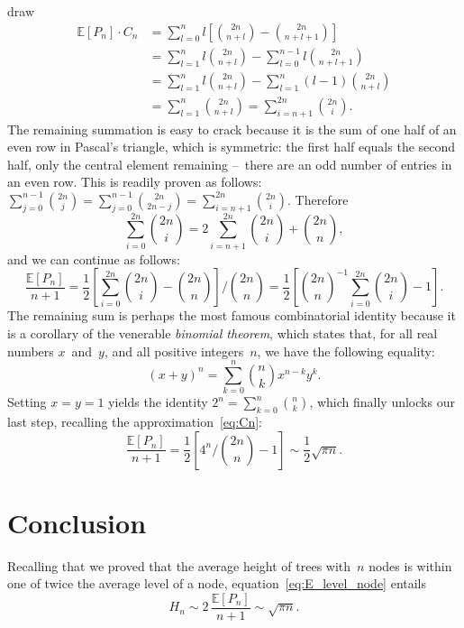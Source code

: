 \documentclass[11pt]{article}
\newcommand\Expected[1]{\mathbb{E}[{#1}]}
\begin{document}
draw
\begin{align*}
\Expected{P_n} \cdot C_n
 &= \sum_{l=0}^{n}l\left[\binom{2n}{n+l} - \binom{2n}{n+l+1}\right]\\
 &= \sum_{l=1}^{n}l \binom{2n}{n+l} - \sum_{l=0}^{n-1}l \binom{2n}{n+l+1}\\
 &= \sum_{l=1}^{n}l \binom{2n}{n+l} - \sum_{l=1}^{n}(l-1)\binom{2n}{n+l}\\
 &= \sum_{l=1}^{n}\binom{2n}{n+l}
  = \sum_{i=n+1}^{2n}\binom{2n}{i}.
\end{align*}
The remaining summation is easy to crack because it is the sum of one
half of an even row in Pascal's triangle, which is symmetric: the
first half equals the second half, only the central element remaining
--~there are an odd number of entries in an even row. This is readily
proven as follows: \(\sum_{j=0}^{n-1}\binom{2n}{j} =
\sum_{j=0}^{n-1}\binom{2n}{2n-j} =
\sum_{i=n+1}^{2n}\binom{2n}{i}\). Therefore
\begin{equation*}
\sum_{i=0}^{2n}\binom{2n}{i} = 2 \sum_{i=n+1}^{2n}\binom{2n}{i}
+ \binom{2n}{n},
\end{equation*}
and we can continue as follows:
\begin{equation*}
\frac{\Expected{P_n}}{n+1}
   = \frac{1}{2}\left[\sum_{i=0}^{2n}\binom{2n}{i} -
     \binom{2n}{n}\right]\bigg/ \binom{2n}{n}
  = \frac{1}{2}\left[\binom{2n}{n}^{-1}\sum_{i=0}^{2n}\binom{2n}{i} - 1\right].
\end{equation*}
The remaining sum is perhaps the most famous combinatorial identity
because it is a corollary of the venerable \emph{binomial theorem},
which states that, for all real numbers \(x\)~and~\(y\), and all
positive integers~\(n\), we have the following equality:
\begin{equation*}
(x+y)^n = \sum_{k=0}^{n}\binom{n}{k}x^{n-k}y^k.
\end{equation*}
Setting \(x=y=1\) yields the identity \(2^n =
\sum_{k=0}^{n}\binom{n}{k}\), which finally unlocks our last step,
recalling the approximation~\eqref{eq:Cn}:
\begin{equation}
\frac{\Expected{P_n}}{n+1} = \frac{1}{2}\left[4^{n}\big/\binom{2n}{n}
  - 1\right] \sim \frac{1}{2}\sqrt{\pi n}.
\label{eq:E_level_node}
\end{equation}

\section*{Conclusion}

Recalling that we proved that the average height of trees with~$n$
nodes is within one of twice the average level of a node,
equation~\eqref{eq:E_level_node} entails
\begin{equation*}
H_n \sim 2 \, \frac{\Expected{P_n}}{n+1} \sim \sqrt{\pi n}.
\end{equation*}


\end{document}
